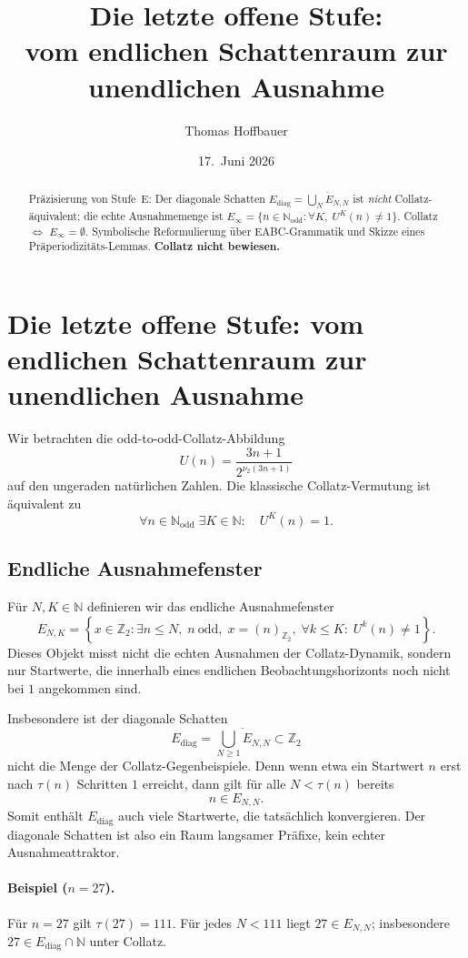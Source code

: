 \documentclass[12pt,a4paper]{article}
\title{Die letzte offene Stufe:\\
vom endlichen Schattenraum zur unendlichen Ausnahme}
\author{Thomas Hoffbauer}
\date{17.\ Juni 2026}
\newcommand{\N}{\mathbb{N}}
\newcommand{\Ztwo}{\mathbb{Z}_2}
\newcommand{\Nodd}{\mathbb{N}_{\mathrm{odd}}}
\newcommand{\Einf}{E_{\infty}}
\newcommand{\Ediag}{E_{\mathrm{diag}}}
\begin{document}
\maketitle

\begin{abstract}
Präzisierung von Stufe~E: Der diagonale Schatten
$\Ediag=\overline{\bigcup_N E_{N,N}}$ ist \emph{nicht} Collatz-äquivalent;
die echte Ausnahmemenge ist $\Einf=\{n\in\Nodd:\forall K,\;U^K(n)\neq 1\}$.
Collatz $\Leftrightarrow$ $\Einf=\emptyset$. Symbolische Reformulierung über
EABC-Grammatik und Skizze eines Präperiodizitäts-Lemmas. \textbf{Collatz nicht bewiesen.}
\end{abstract}

\section{Die letzte offene Stufe: vom endlichen Schattenraum zur unendlichen Ausnahme}

Wir betrachten die odd-to-odd-Collatz-Abbildung
\[
U(n)=\frac{3n+1}{2^{\nu_2(3n+1)}}
\]
auf den ungeraden natürlichen Zahlen. Die klassische Collatz-Vermutung ist äquivalent zu
\[
\forall n\in\Nodd\;\exists K\in\N:\quad U^K(n)=1.
\]

\subsection{Endliche Ausnahmefenster}

Für $N,K\in\N$ definieren wir das endliche Ausnahmefenster
\[
E_{N,K}
=
\left\{
x\in\Ztwo:
\exists n\leq N,\; n\ \mathrm{odd},\; x=(n)_{\Ztwo},
\;\forall k\leq K:\; U^k(n)\neq 1
\right\}.
\]
Dieses Objekt misst nicht die echten Ausnahmen der Collatz-Dynamik, sondern nur Startwerte, die innerhalb eines endlichen Beobachtungshorizonts noch nicht bei $1$ angekommen sind.

Insbesondere ist der diagonale Schatten
\[
\Ediag
=
\overline{\bigcup_{N\geq 1} E_{N,N}}
\subset \Ztwo
\]
nicht die Menge der Collatz-Gegenbeispiele. Denn wenn etwa ein Startwert $n$ erst nach $\tau(n)$ Schritten $1$ erreicht, dann gilt für alle $N<\tau(n)$ bereits
\[
n\in E_{N,N}.
\]
Somit enthält $\Ediag$ auch viele Startwerte, die tatsächlich konvergieren. Der diagonale Schatten ist also ein Raum langsamer Präfixe, kein echter Ausnahmeattraktor.

\paragraph{Beispiel ($n=27$).}
Für $n=27$ gilt $\tau(27)=111$. Für jedes $N<111$ liegt $27\in E_{N,N}$; insbesondere $27\in\Ediag\cap\N$ unter Collatz.
\end{document}
